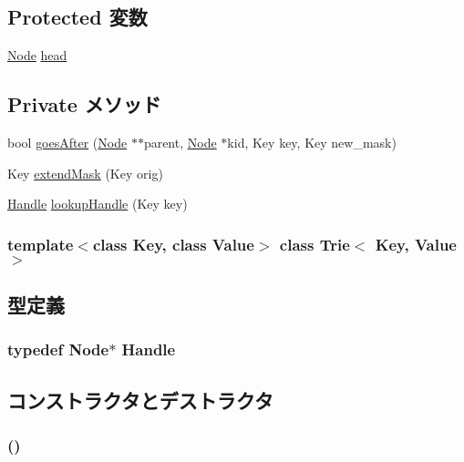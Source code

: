 \subsection*{Protected 変数}
\begin{DoxyCompactItemize}
\item 
\hyperlink{structTrie_1_1Node}{Node} \hyperlink{classTrie_ab0204d8f12b6e8896928382d5274cab0}{head}
\end{DoxyCompactItemize}
\subsection*{Private メソッド}
\begin{DoxyCompactItemize}
\item 
bool \hyperlink{classTrie_a119d09ea5d42aaac788297a445aa0e70}{goesAfter} (\hyperlink{structTrie_1_1Node}{Node} $\ast$$\ast$parent, \hyperlink{structTrie_1_1Node}{Node} $\ast$kid, Key key, Key new\_\-mask)
\item 
Key \hyperlink{classTrie_a09c7054156a02051d58b05d11555150a}{extendMask} (Key orig)
\item 
\hyperlink{structTrie_1_1Node}{Handle} \hyperlink{classTrie_a23b4df3a07bf7a4232b88548df7689ce}{lookupHandle} (Key key)
\end{DoxyCompactItemize}
\subsubsection*{template$<$class Key, class Value$>$ class Trie$<$ Key, Value $>$}



\subsection{型定義}
\hypertarget{classTrie_a9c85d428a12b0d5a24c678a5a010b97e}{
\subsubsection[{Handle}]{\setlength{\rightskip}{0pt plus 5cm}typedef {\bf Node}$\ast$ {\bf Handle}}}
\label{classTrie_a9c85d428a12b0d5a24c678a5a010b97e}


\subsection{コンストラクタとデストラクタ}
\hypertarget{classTrie_afa1796b4255b39148352d11b224a13dc}{
\subsubsection[{Trie}]{ ()}}
\label{classTrie_afa1796b4255b39148352d11b224a13dc}




